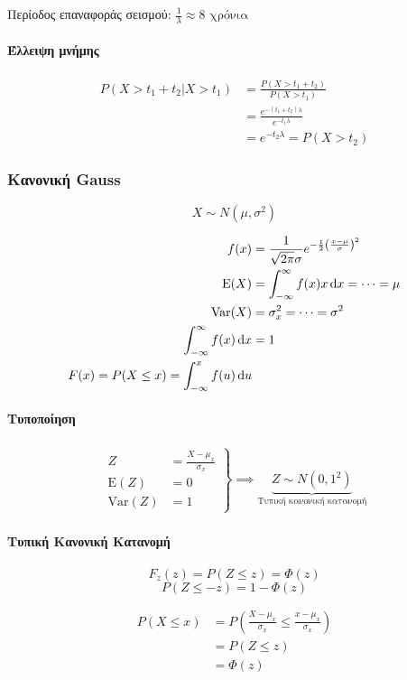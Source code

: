 \documentclass[11pt,a4paper,titlepage,draft]{article}
\begin{document}
Περίοδος επαναφοράς σεισμού: \(\frac{1}{\lambda } \approx 8 \text{ χρόνια}\)

\paragraph{Έλλειψη μνήμης}
\begin{align*}
P(X > t_1 + t_2 | X > t_1) &= \frac{P(X>t_1+t_2)}{P(X>t_1)}
\\ &= \frac{e^{-(t_1+t_2)\lambda }}{e^{-t_1 \lambda }} \\
&= e^{-t_2\lambda } = P(X> t_2)
\end{align*}

\subsubsection{Κανονική \textlatin{Gauss}}
\[
X \sim N(\mu, \sigma^2)
\]

\begin{align*}
f(x) &= \frac{1}{\sqrt{2\pi}\sigma} e^{-\frac{1}{2} \left(\frac{x-\mu}{\sigma} \right)^2 }\\
\mathrm E(X) &= \int_{-\infty}^\infty f(x) x \dif x = \dots = \mu\\
\mathrm{Var}(X) &= \sigma_x^2 = \dots = \sigma^2 \\
\int_{-\infty}^\infty f(x) \dif x &= 1 \\
F(x) = P(X \leq x) = \int_{-\infty}^x f(u) \dif u
\end{align*}

\paragraph{Τυποποίηση} \begin{align*}
\left. \begin{array}{rl}
Z &= \frac{X-\mu_x}{\sigma_x} \\
\mathrm E(Z) &= 0 \\
\mathrm{Var}(Z) &= 1
\end{array} \right\rbrace \implies \underbrace{Z \sim N(0,1^2)}_{\text{Τυπική κανονική κατανομή}}
\end{align*}

\paragraph{Τυπική Κανονική Κατανομή}
\[
F_z(z) = P(Z \leq z) = \Phi(z)
\]
\[
P(Z \leq -z) = 1 - \Phi(z)
\]

\begin{align*}
P(X \leq x) &= P \left(
\frac{X-\mu_x}{\sigma_x} \leq \frac{x-\mu_x}{\sigma_x}
\right)  \\
&= P(Z \leq z) \\ &= \Phi(z)
\end{align*}
\end{document}
